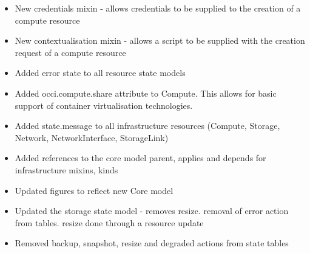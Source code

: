\documentclass[10pt,a4paper]{article}
\begin{document}
\begin{itemize}
\item New credentials mixin - allows credentials to be supplied to the creation of a compute resource
\item New contextualisation mixin - allows a script to be supplied with the creation request of a compute resource
\item Added error state to all resource state models
\item Added occi.compute.share attribute to Compute. This allows for basic support of container virtualisation technologies.
\item Added state.message to all infrastructure resources (Compute, Storage, Network, NetworkInterface, StorageLink)
\item Added references to the core model parent, applies and depends for infrastructure mixins, kinds
\item Updated figures to reflect new Core model
\item Updated the storage state model - removes resize. removal of error action from tables. resize done through a resource update
\item Removed backup, snapshot, resize and degraded actions from state tables
\end{itemize}
\end{document}

